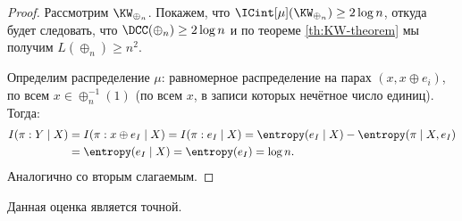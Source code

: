 \begin{proof}
    Рассмотрим $\KW_{\oplus_n}$. Покажем, что $\ICint[\mu](\KW_{\oplus_n}) \ge 2 \log n$, откуда будет
    следовать, что $\DCC(\oplus_n) \ge 2 \log n$ и по теореме \ref{th:KW-theorem} мы получим $L(\oplus_n)
    \ge n^2$.

    Определим распределение $\mu$: равномерное распределение на парах $(x, x \oplus e_i) $, по всем $x
    \in \oplus_n^{-1}(1)$ (по всем $x$, в записи которых нечётное число единиц). Тогда:
    \begin{align*}
        I(\pi : Y \mid X) &= I(\pi: x \oplus e_I \mid X) = I(\pi : e_I \mid X) = \entropy(e_I \mid X) -
                            \entropy(\pi \mid X, e_I) \\
        &= \entropy(e_I \mid X) = \entropy(e_I) = \log n.
    \end{align*}
    Аналогично со вторым слагаемым.
\end{proof}

Данная оценка является точной.

